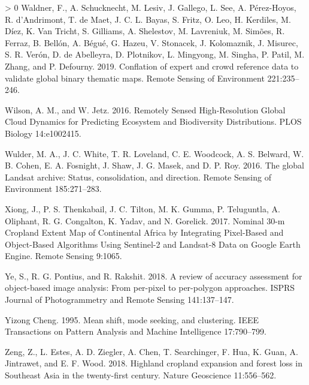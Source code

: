 \documentclass[11pt,a4paper]{article}
\newlength{\cslhangindent}
\newenvironment{CSLReferences}[3] %
 {%
  \setlength{\parindent}{0pt}
  \ifodd #1 \everypar{\setlength{\hangindent}{\cslhangindent}}\ignorespaces\fi
  \ifnum #2 > 0
  \setlength{\parskip}{#2\baselineskip}
  \fi
 }%
 {}
\begin{document}
\begin{CSLReferences}{1}{0}
\leavevmode\hypertarget{ref-WaldnerConflationexpertcrowd2019}{}%
Waldner, F., A. Schucknecht, M. Lesiv, J. Gallego, L. See, A.
Pérez-Hoyos, R. d'Andrimont, T. de Maet, J. C. L. Bayas, S. Fritz, O.
Leo, H. Kerdiles, M. Díez, K. Van Tricht, S. Gilliams, A. Shelestov, M.
Lavreniuk, M. Simões, R. Ferraz, B. Bellón, A. Bégué, G. Hazeu, V.
Stonacek, J. Kolomaznik, J. Misurec, S. R. Verón, D. de Abelleyra, D.
Plotnikov, L. Mingyong, M. Singha, P. Patil, M. Zhang, and P. Defourny.
2019. Conflation of expert and crowd reference data to validate global
binary thematic maps. Remote Sensing of Environment 221:235--246.

\leavevmode\hypertarget{ref-WilsonRemotelySensedHighResolution2016}{}%
Wilson, A. M., and W. Jetz. 2016. Remotely {Sensed High}-{Resolution
Global Cloud Dynamics} for {Predicting Ecosystem} and {Biodiversity
Distributions}. PLOS Biology 14:e1002415.

\leavevmode\hypertarget{ref-WulderglobalLandsatarchive2016}{}%
Wulder, M. A., J. C. White, T. R. Loveland, C. E. Woodcock, A. S.
Belward, W. B. Cohen, E. A. Fosnight, J. Shaw, J. G. Masek, and D. P.
Roy. 2016. The global {Landsat} archive: Status, consolidation, and
direction. Remote Sensing of Environment 185:271--283.

\leavevmode\hypertarget{ref-XiongNominal30mCropland2017}{}%
Xiong, J., P. S. Thenkabail, J. C. Tilton, M. K. Gumma, P. Teluguntla,
A. Oliphant, R. G. Congalton, K. Yadav, and N. Gorelick. 2017. Nominal
30-m {Cropland Extent Map} of {Continental Africa} by {Integrating
Pixel}-{Based} and {Object}-{Based Algorithms Using Sentinel}-2 and
{Landsat}-8 {Data} on {Google Earth Engine}. Remote Sensing 9:1065.

\leavevmode\hypertarget{ref-yeReviewAccuracyAssessment2018}{}%
Ye, S., R. G. Pontius, and R. Rakshit. 2018. A review of accuracy
assessment for object-based image analysis: From per-pixel to
per-polygon approaches. ISPRS Journal of Photogrammetry and Remote
Sensing 141:137--147.

\leavevmode\hypertarget{ref-YizongChengMeanshiftmode1995a}{}%
Yizong Cheng. 1995. Mean shift, mode seeking, and clustering. IEEE
Transactions on Pattern Analysis and Machine Intelligence 17:790--799.

\leavevmode\hypertarget{ref-ZengHighlandcroplandexpansion2018}{}%
Zeng, Z., L. Estes, A. D. Ziegler, A. Chen, T. Searchinger, F. Hua, K.
Guan, A. Jintrawet, and E. F. Wood. 2018. Highland cropland expansion
and forest loss in {Southeast Asia} in the twenty-first century. Nature
Geoscience 11:556--562.


\end{CSLReferences}
\end{document}
